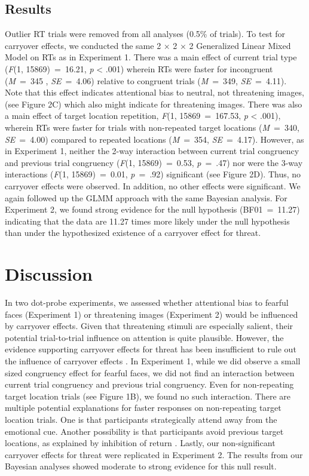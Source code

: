 \documentclass[issue,twocolumn,empirical, authordate,10pt]{jote-new-article}
\begin{document}
\subsection{Results}

Outlier RT trials were removed from all analyses (0.5\% of trials). To test for carryover effects, we conducted the same 2 × 2 × 2 Generalized Linear Mixed Model on RTs as in Experiment 1. There was a main effect of current trial type (\emph{F}(1, 15869)~=~16.21, \emph{p }< .001) wherein RTs were faster for incongruent (\emph{M}~=~345 , \emph{SE}~=~4.06) relative to congruent trials (\emph{M}~=~349, \emph{SE}~=~4.11). Note that this effect indicates attentional bias to neutral, not threatening images, (see Figure 2C) which also might indicate for threatening images. There was also a main effect of target location repetition, \emph{F}(1, 15869~=~167.53, \emph{p }< .001), wherein RTs were faster for trials with non-repeated target locations (\emph{M}~=~340, \emph{SE}~=~4.00) compared to repeated locations (\emph{M}~=~354, \emph{SE}~=~4.17). However, as in Experiment 1, neither the 2-way interaction between current trial congruency and previous trial congruency (\emph{F}(1, 15869)~=~0.53, \emph{p}~=~.47) nor were the 3-way interactions (\emph{F}(1, 15869)~=~0.01, \emph{p}~=~.92) significant (see Figure 2D). Thus, no carryover effects were observed. In addition, no other effects were significant. We again followed up the GLMM approach with the same Bayesian analysis. For Experiment 2, we found strong evidence for the null hypothesis (BF01~=~11.27) indicating that the data are 11.27 times more likely under the null hypothesis than under the hypothesized existence of a carryover effect for threat.





\section{Discussion}

In two dot-probe experiments, we assessed whether attentional bias to fearful faces (Experiment 1) or threatening images (Experiment 2) would be influenced by carryover effects. Given that threatening stimuli are especially salient, their potential trial-to-trial influence on attention is quite plausible. However, the evidence supporting carryover effects for threat has been insufficient to rule out the influence of carryover effects \parencite{Gladwin2019, Hill2016}. In Experiment 1, while we did observe a small sized congruency effect for fearful faces, we did not find an interaction between current trial congruency and previous trial congruency. Even for non-repeating target location trials (see Figure 1B), we found no such interaction. There are multiple potential explanations for faster responses on non-repeating target location trials. One is that participants strategically attend away from the emotional cue. Another possibility is that participants avoid previous target locations, as explained by inhibition of return \parencite{Posner1985}. Lastly, our non-significant carryover effects for threat were replicated in Experiment 2. The results from our Bayesian analyses showed moderate to strong evidence for this null result.
\end{document}
